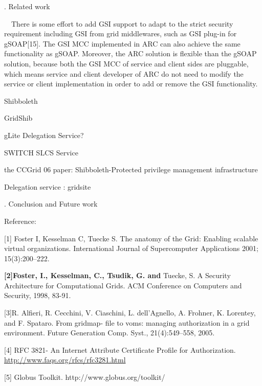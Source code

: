 \documentclass{article}
\newcommand\textstyleStrongEmphasis[1]{\textbf{#1}}
\begin{document}
\bigskip

{. Related work
\par}


\bigskip

\ \ There is some effort to add GSI support to adapt to the strict
security requirement including GSI from grid middlewares, such as GSI
plug-in for gSOAP[15]. The GSI MCC implemented in ARC can also achieve
the same functionality as gSOAP. Moreover, the ARC solution is flexible
than the gSOAP solution, because both the GSI MCC of service and client
sides are pluggable, which means service and client developer of ARC do
not need to modify the service or client implementation in order to add
or remove the GSI functionality.


\bigskip

Shibboleth

GridShib

gLite Delegation Service?

SWITCH SLCS Service

the CCGrid 06 paper: Shibboleth-Protected privilege management
infrastructure

Delegation service : gridsite


\bigskip


\bigskip

{. Conclusion and Future work
\par}


\bigskip


\bigskip

Reference:

[1] Foster I, Kesselman C, Tuecke S. The anatomy of the Grid: Enabling
scalable virtual organizations. International Journal of Supercomputer
Applications 2001; 15(3):200--222. 

\textstyleStrongEmphasis{\textmd{[2]}}\textstyleStrongEmphasis{\textmd{Foster,
I., Kesselman, C., Tsudik, G. and }}Tuecke, S. A Security Architecture
for Computational Grids. ACM Conference on Computers and Security,
1998, 83-91.

[3]R. Alfieri, R. Cecchini, V. Ciaschini, L.
dell{\textquoteright}Agnello, A. Frohner, K. Lorentey, and F. Spataro.
From gridmap- file to voms: managing authorization in a grid
environment. Future Generation Comp. Syst., 21(4):549--558, 2005. 

[4] RFC 3821- An Internet Attribute Certificate Profile for
Authorization. \url{http://www.faqs.org/rfcs/rfc3281.html}

[5] Globus Toolkit. http://www.globus.org/toolkit/
\end{document}

